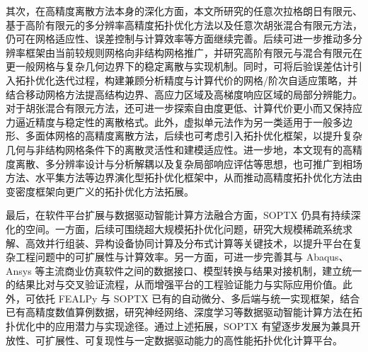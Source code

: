 其次，在高精度离散方法本身的深化方面，本文所研究的任意次拉格朗日有限元、基于高阶有限元的多分辨率高精度拓扑优化方法以及任意次胡张混合有限元方法，仍可在网格适应性、误差控制与计算效率等方面继续完善。后续可进一步推动多分辨率框架由当前较规则网格向非结构网格推广，并研究高阶有限元与混合有限元在更一般网格与复杂几何边界下的稳定离散与实现机制。同时，可将后验误差估计引入拓扑优化迭代过程，构建兼顾分析精度与计算代价的网格/阶次自适应策略，并结合移动网格方法提高结构边界、高应力区域及高梯度响应区域的局部分辨能力。对于胡张混合有限元方法，还可进一步探索自由度更低、计算代价更小而又保持应力逼近精度与稳定性的离散格式。此外，虚拟单元法作为另一类适用于一般多边形、多面体网格的高精度离散方法，后续也可考虑引入拓扑优化框架，以提升复杂几何与非结构网格条件下的离散灵活性和建模适应性。进一步地，本文现有的高精度离散、多分辨率设计与分析解耦以及复杂局部响应评估等思想，也可推广到相场方法、水平集方法等边界演化型拓扑优化框架中，从而推动高精度拓扑优化方法由变密度框架向更广义的拓扑优化方法拓展。

最后，在软件平台扩展与数据驱动智能计算方法融合方面，SOPTX 仍具有持续深化的空间。一方面，后续可围绕超大规模拓扑优化问题，研究大规模稀疏系统求解、高效并行组装、异构设备协同计算及分布式计算等关键技术，以提升平台在复杂工程问题中的可扩展性与计算效率。另一方面，可进一步完善其与 Abaqus、Ansys 等主流商业仿真软件之间的数据接口、模型转换与结果对接机制，建立统一的结果比对与交叉验证流程，从而增强平台的工程验证能力与实际应用价值。此外，可依托 FEALPy 与 SOPTX 已有的自动微分、多后端与统一实现框架，结合已有高精度数值算例数据，研究神经网络、深度学习等数据驱动智能计算方法在拓扑优化中的应用潜力与实现途径。通过上述拓展，SOPTX 有望逐步发展为兼具开放性、可扩展性、可复现性与一定数据驱动能力的高性能拓扑优化计算平台。



